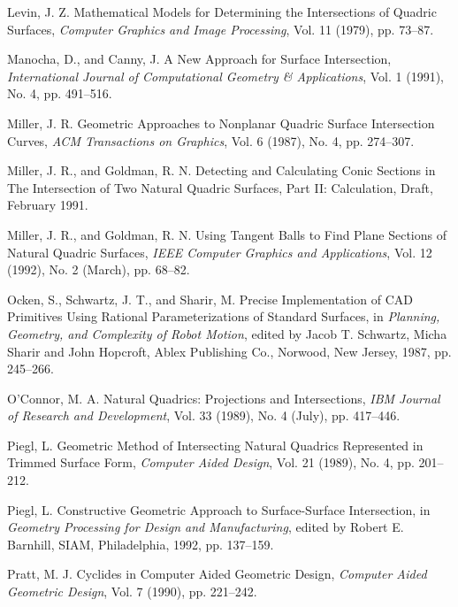 \begin{thebibliography}{999}
     Levin, J. Z.
     Mathematical Models for Determining the Intersections of Quadric Surfaces,
     {\em Computer Graphics and Image Processing},
     Vol. 11 (1979), pp. 73--87.

     Manocha, D., and Canny, J.
     A New Approach for Surface Intersection,
     {\em International Journal of Computational Geometry \& Applications},
     Vol. 1 (1991), No. 4, pp. 491--516.

     Miller, J. R.
     Geometric Approaches to Nonplanar Quadric Surface Intersection Curves,
     {\em ACM Transactions on Graphics},
     Vol. 6 (1987), No. 4, pp. 274--307.

     Miller, J. R., and Goldman, R. N.
     Detecting and Calculating Conic Sections in The Intersection of
     Two Natural Quadric Surfaces, Part II: Calculation,
     Draft, February 1991.

     Miller, J. R., and Goldman, R. N.
     Using Tangent Balls to Find Plane Sections of Natural Quadric Surfaces,
     {\em IEEE Computer Graphics and Applications},
     Vol. 12 (1992), No. 2 (March), pp. 68--82.

     Ocken, S., Schwartz, J. T., and Sharir, M.
     Precise Implementation of CAD Primitives Using Rational Parameterizations
     of Standard Surfaces,
     in {\em Planning, Geometry, and Complexity of Robot Motion}, edited by
     Jacob T. Schwartz, Micha Sharir and John Hopcroft,
     Ablex Publishing Co., Norwood, New Jersey, 1987, pp. 245--266.

     O'Connor, M. A.
     Natural Quadrics: Projections and Intersections,
     {\em IBM Journal of Research and Development},
     Vol. 33 (1989), No. 4 (July), pp. 417--446.

     Piegl, L.
     Geometric Method of Intersecting Natural Quadrics Represented in Trimmed
     Surface Form,
     {\em Computer Aided Design}, Vol. 21 (1989), No. 4, pp. 201--212.

     Piegl, L.
     Constructive Geometric Approach to Surface-Surface Intersection,
     in {\em Geometry Processing for Design and Manufacturing},
     edited by Robert E. Barnhill, SIAM, Philadelphia, 1992, pp. 137--159.

     Pratt, M. J.
     Cyclides in Computer Aided Geometric Design,
     {\em Computer Aided Geometric Design},
     Vol. 7 (1990), pp. 221--242.


\end{thebibliography}
